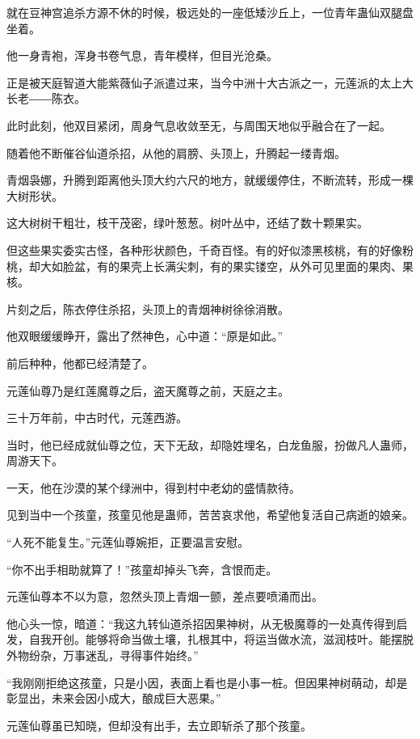 
\begin{this_body}

就在豆神宫追杀方源不休的时候，极远处的一座低矮沙丘上，一位青年蛊仙双腿盘坐着。

他一身青袍，浑身书卷气息，青年模样，但目光沧桑。

正是被天庭智道大能紫薇仙子派遣过来，当今中洲十大古派之一，元莲派的太上大长老――陈衣。

此时此刻，他双目紧闭，周身气息收敛至无，与周围天地似乎融合在了一起。

随着他不断催谷仙道杀招，从他的肩膀、头顶上，升腾起一缕青烟。

青烟袅娜，升腾到距离他头顶大约六尺的地方，就缓缓停住，不断流转，形成一棵大树形状。

这大树树干粗壮，枝干茂密，绿叶葱葱。树叶丛中，还结了数十颗果实。

但这些果实委实古怪，各种形状颜色，千奇百怪。有的好似漆黑核桃，有的好像粉桃，却大如脸盆，有的果壳上长满尖刺，有的果实镂空，从外可见里面的果肉、果核。

片刻之后，陈衣停住杀招，头顶上的青烟神树徐徐消散。

他双眼缓缓睁开，露出了然神色，心中道：“原是如此。”

前后种种，他都已经清楚了。

元莲仙尊乃是红莲魔尊之后，盗天魔尊之前，天庭之主。

三十万年前，中古时代，元莲西游。

当时，他已经成就仙尊之位，天下无敌，却隐姓埋名，白龙鱼服，扮做凡人蛊师，周游天下。

一天，他在沙漠的某个绿洲中，得到村中老幼的盛情款待。

见到当中一个孩童，孩童见他是蛊师，苦苦哀求他，希望他复活自己病逝的娘亲。

“人死不能复生。”元莲仙尊婉拒，正要温言安慰。

“你不出手相助就算了！”孩童却掉头飞奔，含恨而走。

元莲仙尊本不以为意，忽然头顶上青烟一颤，差点要喷涌而出。

他心头一惊，暗道：“我这九转仙道杀招因果神树，从无极魔尊的一处真传得到启发，自我开创。能够将命当做土壤，扎根其中，将运当做水流，滋润枝叶。能摆脱外物纷杂，万事迷乱，寻得事件始终。”

“我刚刚拒绝这孩童，只是小因，表面上看也是小事一桩。但因果神树萌动，却是彰显出，未来会因小成大，酿成巨大恶果。”

元莲仙尊虽已知晓，但却没有出手，去立即斩杀了那个孩童。


\end{this_body}
